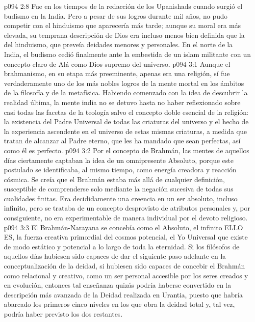\vs p094 2:8 \pc Fue en los tiempos de la redacción de los Upanishads cuando surgió el budismo en la India. Pero a pesar de sus logros durante mil años, no pudo competir con el hinduismo que aparecería más tarde; aunque su moral era más elevada, su temprana descripción de Dios era incluso menos bien definida que la del hinduismo, que preveía deidades menores y personales. En el norte de la India, el budismo cedió finalmente ante la embestida de un islam militante con un concepto claro de Alá como Dios supremo del universo.
\vs p094 3:1 Aunque el brahmanismo, en su etapa más preeminente, apenas era una religión, sí fue verdaderamente uno de los más nobles logros de la mente mortal en los ámbitos de la filosofía y de la metafísica. Habiendo comenzado con la idea de descubrir la realidad última, la mente india no se detuvo hasta no haber reflexionado sobre casi todas las facetas de la teología salvo el concepto doble esencial de la religión: la existencia del Padre Universal de todas las criaturas del universo y el hecho de la experiencia ascendente en el universo de estas mismas criaturas, a medida que tratan de alcanzar al Padre eterno, que les ha mandado que sean perfectas, así como él es perfecto.
\vs p094 3:2 Por el concepto de Brahmán, las mentes de aquellos días ciertamente captaban la idea de un omnipresente Absoluto, porque este postulado se identificaba, al mismo tiempo, como energía creadora y reacción cósmica. Se creía que el Brahmán estaba más allá de cualquier definición, susceptible de comprenderse solo mediante la negación sucesiva de todas sus cualidades finitas. Era decididamente una creencia en un ser absoluto, incluso infinito, pero se trataba de un concepto desprovisto de atributos personales y, por consiguiente, no era experimentable de manera individual por el devoto religioso.
\vs p094 3:3 El Brahmán\hyp{}Narayana se concebía como el Absoluto, el infinito ELLO ES, la fuerza creativa primordial del cosmos potencial, el Yo Universal que existe de modo estático y potencial a lo largo de toda la eternidad. Si los filósofos de aquellos días hubiesen sido capaces de dar el siguiente paso adelante en la conceptualización de la deidad, si hubiesen sido capaces de concebir el Brahmán como relacional y creativo, como un ser personal accesible por los seres creados y en evolución, entonces tal enseñanza quizás podría haberse convertido en la descripción más avanzada de la Deidad realizada en Urantia, puesto que habría abarcado los primeros cinco niveles en los que obra la deidad total y, tal vez, podría haber previsto los dos restantes.
